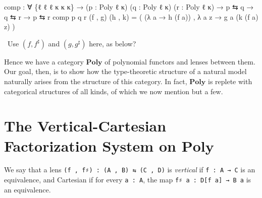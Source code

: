 \documentclass[
  11pt,
  oneside,
  article]{memoir}
\newenvironment{Shaded}{}{}
\newcommand{\NormalTok}[1]{#1}
\newcommand{\OtherTok}[1]{\textcolor[rgb]{0.00,0.44,0.13}{#1}}
\theoremstyle{definition}
\theoremstyle{plain}
\newcommand{\0}{\textsf{0}}
\newcommand{\1}{\tn{\textsf{1}}}
\newcommand{\dnote}[1]{{\quad \color{blue}$\lozenge$\;David says:}~#1\;{\color{blue}$\lozenge$}\quad}
\begin{document}
\begin{Shaded}
\begin{Highlighting}[]
\NormalTok{comp }\OtherTok{:} \OtherTok{∀} \OtherTok{\{}\NormalTok{ℓ ℓ\textquotesingle{} ℓ\textquotesingle{}\textquotesingle{} κ κ\textquotesingle{} κ\textquotesingle{}\textquotesingle{}}\OtherTok{\}} 
       \OtherTok{→} \OtherTok{(}\NormalTok{p }\OtherTok{:}\NormalTok{ Poly ℓ κ}\OtherTok{)} \OtherTok{(}\NormalTok{q }\OtherTok{:}\NormalTok{ Poly ℓ\textquotesingle{} κ\textquotesingle{}}\OtherTok{)} \OtherTok{(}\NormalTok{r }\OtherTok{:}\NormalTok{ Poly ℓ\textquotesingle{}\textquotesingle{} κ\textquotesingle{}\textquotesingle{}}\OtherTok{)}
       \OtherTok{→}\NormalTok{ p ⇆ q }\OtherTok{→}\NormalTok{ q ⇆ r }\OtherTok{→}\NormalTok{ p ⇆ r }
\NormalTok{comp p q r }\OtherTok{(}\NormalTok{f , g}\OtherTok{)} \OtherTok{(}\NormalTok{h , k}\OtherTok{)} \OtherTok{=} 
    \OtherTok{(} \OtherTok{(λ}\NormalTok{ a }\OtherTok{→}\NormalTok{ h }\OtherTok{(}\NormalTok{f a}\OtherTok{))}\NormalTok{ , }\OtherTok{λ}\NormalTok{ a z }\OtherTok{→}\NormalTok{ g a }\OtherTok{(}\NormalTok{k }\OtherTok{(}\NormalTok{f a}\OtherTok{)}\NormalTok{ z}\OtherTok{)} \OtherTok{)}
\end{Highlighting}
\end{Shaded}\dnote{Use $(f, f^\sharp)$ and $(g,g^\sharp)$ here, as below?}

Hence we have a category \(\mathbf{Poly}\) of polynomial functors and
lenses between them. Our goal, then, is to show how the type-theoretic
structure of a natural model naturally arises from the structure of this
category. In fact, \(\mathbf{Poly}\) is replete with categorical
structures of all kinds, of which we now mention but a few.

\section{\texorpdfstring{The Vertical-Cartesian Factorization System on
\(\mathbf{Poly}\)}{The Vertical-Cartesian Factorization System on \textbackslash mathbf\{Poly\}}}\label{the-vertical-cartesian-factorization-system-on-mathbfpoly}

We say that a lens \texttt{(f\ ,\ f♯)\ :\ (A\ ,\ B)\ ⇆\ (C\ ,\ D)} is
\emph{vertical} if \texttt{f\ :\ A\ →\ C} is an equivalence, and
Cartesian if for every \texttt{a\ :\ A}, the map
\texttt{f♯\ a\ :\ D{[}f\ a{]}\ →\ B\ a} is an equivalence.
\end{document}
